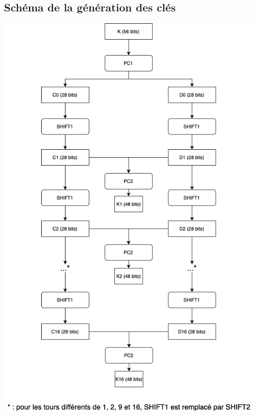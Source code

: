 \documentclass[10pt,a4paper]{article}
\begin{document}
\subsection{Schéma de la génération des clés}
\label{schema 3}
 \begin{center}
\includegraphics[scale=0.7]{../schemas/Schema_DES_generation_cles.png}
 \end{center}
\end{document}
